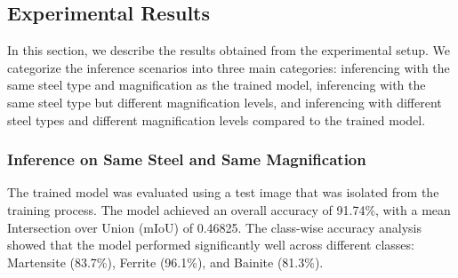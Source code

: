 \documentclass[]{article}
\begin{document}
\subsection{Experimental Results}

In this section, we describe the results obtained from the experimental setup. We categorize the inference scenarios into three main categories: inferencing with the same steel type and magnification as the trained model, inferencing with the same steel type but different magnification levels, and inferencing with different steel types and different magnification levels compared to the trained model. 

\subsubsection{Inference on Same Steel and Same Magnification}

The trained model was evaluated using a test image that was isolated from the training process. The model achieved an overall accuracy of 91.74\%, with a mean Intersection over Union (mIoU) of 0.46825. The class-wise accuracy analysis showed that the model performed significantly well across different classes: Martensite (83.7\%), Ferrite (96.1\%), and Bainite (81.3\%).
\end{document}
